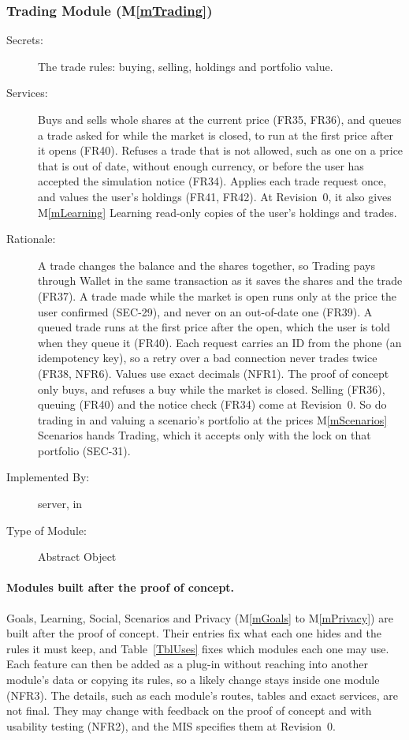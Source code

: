 \documentclass[12pt, titlepage]{article}
\newcommand{\mref}[1]{M\ref{#1}}
\begin{document}
\subsubsection{Trading Module (\mref{mTrading})}

\begin{description}
\item[Secrets:] The trade rules: buying, selling, holdings and portfolio value.
\item[Services:] Buys and sells whole shares at the current price (FR35, FR36), and queues a trade asked for while the market is closed, to run at the first price after it opens (FR40). Refuses a trade that is not allowed, such as one on a price that is out of date, without enough currency, or before the user has accepted the simulation notice (FR34). Applies each trade request once, and values the user's holdings (FR41, FR42). At Revision~0, it also gives \mref{mLearning} Learning read-only copies of the user's holdings and trades.
\item[Rationale:] A trade changes the balance and the shares together, so Trading pays through Wallet in the same transaction as it saves the shares and the trade (FR37). A trade made while the market is open runs only at the price the user confirmed (SEC-29), and never on an out-of-date one (FR39). A queued trade runs at the first price after the open, which the user is told when they queue it (FR40). Each request carries an ID from the phone (an idempotency key), so a retry over a bad connection never trades twice (FR38, NFR6). Values use exact decimals (NFR1). The proof of concept only buys, and refuses a buy while the market is closed. Selling (FR36), queuing (FR40) and the notice check (FR34) come at Revision~0. So do trading in and valuing a scenario's portfolio at the prices \mref{mScenarios} Scenarios hands Trading, which it accepts only with the lock on that portfolio (SEC-31).
\item[Implemented By:] \progname{} server, in 
\item[Type of Module:] Abstract Object
\end{description}

\paragraph{Modules built after the proof of concept.} Goals, Learning,
Social, Scenarios and Privacy (\mref{mGoals} to \mref{mPrivacy}) are built
after the proof of concept. Their entries fix what each one hides and the
rules it must keep, and Table~\ref{TblUses} fixes which modules each one may
use. Each feature can then be added
as a plug-in without reaching into another module's data or copying its rules,
so a likely change stays inside one module (NFR3). The details, such as each
module's routes, tables and exact services, are not final. They may change
with feedback on the proof of concept and with usability testing (NFR2), and
the MIS specifies them at Revision~0.
\end{document}
